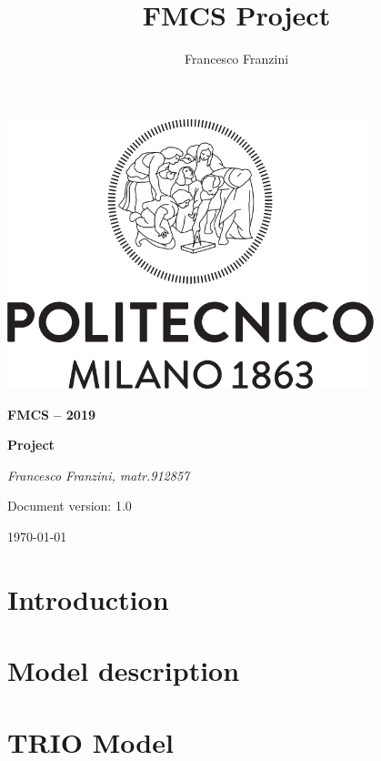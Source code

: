 \documentclass[a4paper]{article}
\author{Francesco Franzini}
\title{FMCS Project}
\begin{document}
	
\begin{titlepage}
	\centering
	\includegraphics[width=0.80\textwidth]{pictures/Logo_Politecnico_Milano}\par
	\vspace{1.5cm}
	{\LARGE \textbf {FMCS – 2019} \par}
	\vspace{0.3cm}
	{\large \textbf{Project} \par}
	\vspace{1.5cm}
	{\Large{} \par}
	\vspace{1.5cm}
	{\Large\itshape Francesco Franzini, matr.912857 \\}
	\vspace{2cm}
	\vfill
	{\large Document version: 1.0\par}
	{\large \today \par}
\end{titlepage}	
	

\maketitle
\tableofcontents
\clearpage

\section{Introduction}



\clearpage

\section{Model description}





\clearpage

\section{TRIO Model}


\clearpage

	
\end{document}
